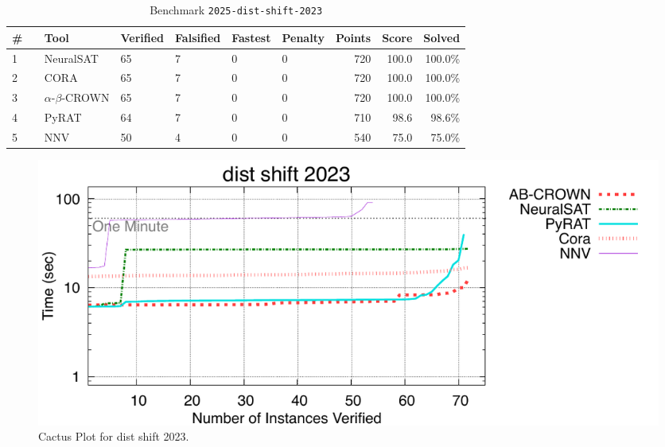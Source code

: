 \begin{table}[h]
\begin{center}
\caption{Benchmark \texttt{2025-dist-shift-2023}} \label{tab:cat_2025_dist_shift_2023}
{\setlength{\tabcolsep}{2pt}
\begin{tabular}[h]{@{}llllllrrr@{}}
\toprule
\textbf{\# ~} & \textbf{Tool} & \textbf{Verified} & \textbf{Falsified} & \textbf{Fastest} & \textbf{Penalty} & \textbf{Points} & \textbf{Score} & \textbf{Solved}\\
\midrule
1 & NeuralSAT & 65 & 7 & 0 & 0 & 720 & 100.0 & 100.0\% \\
2 & CORA & 65 & 7 & 0 & 0 & 720 & 100.0 & 100.0\% \\
3 & $\alpha$-$\beta$-CROWN & 65 & 7 & 0 & 0 & 720 & 100.0 & 100.0\% \\
4 & PyRAT & 64 & 7 & 0 & 0 & 710 & 98.6 & 98.6\% \\
5 & NNV & 50 & 4 & 0 & 0 & 540 & 75.0 & 75.0\% \\
\bottomrule
\end{tabular}
}
\end{center}
\end{table}



\begin{figure}[h]
\centerline{\includegraphics[width=\textwidth]{cactus/2025_dist_shift_2023.pdf}}
\caption{Cactus Plot for dist shift 2023.}
\label{fig:quantPic}
\end{figure}


\clearpage

